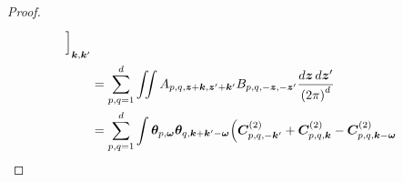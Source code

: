 \documentclass[10pt,noinfoline]{imsart}
\newcommand{\bs}{\boldsymbol}
\begin{document}
\begin{proof}
\begin{align}
        \,
        \Bigr]{\vphantom{\int}}_{\bs k,\bs k^\prime} \nonumber\\
        &=\sum_{p,q=1}^d
        \iint  A_{p,q,\bs z+\bs k, \bs z^\prime+\bs k^\prime}B_{p,q,-\bs z, -\bs z^\prime}\frac{d\bs z \, d\bs z^\prime}{{(2\pi)}^d} \nonumber\\
        &=\sum_{p,q=1}^d\int 
        \bs\theta_{p,\bs\omega}\bs\theta_{q,\bs k+\bs k^\prime - \bs\omega}
		 \Bigl(
         {\bs C^{(2)}_{p,q,-\bs k^\prime}}
        + {\bs C^{(2)}_{p,q,\bs k}}
        - {\bs C^{(2)}_{p,q,\bs k - \bs\omega}}

\end{align}
\end{proof}
\end{document}
